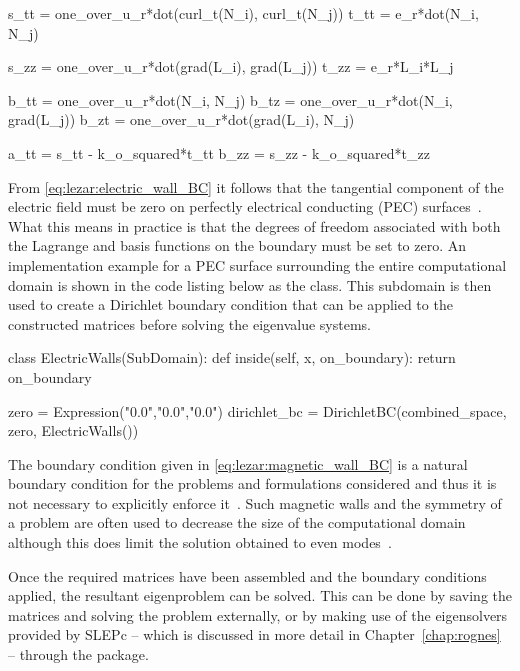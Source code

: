 \begin{python}
s_tt = one_over_u_r*dot(curl_t(N_i), curl_t(N_j))
t_tt = e_r*dot(N_i, N_j)

s_zz = one_over_u_r*dot(grad(L_i), grad(L_j))
t_zz = e_r*L_i*L_j

b_tt = one_over_u_r*dot(N_i, N_j)
b_tz = one_over_u_r*dot(N_i, grad(L_j))
b_zt = one_over_u_r*dot(grad(L_i), N_j)

a_tt = s_tt - k_o_squared*t_tt
b_zz = s_zz - k_o_squared*t_zz
\end{python}

\vspace*{5pt}

\noindent From \eqref{eq:lezar:electric_wall_BC} it follows that the tangential
component of the electric field must be zero on perfectly electrical
conducting (PEC) surfaces~\citep{Smith1997}. What this means in
practice is that the degrees of freedom associated with both the
Lagrange and \nedelec{} basis functions \pagebreak on the boundary must be set
to zero. An implementation example for a PEC surface surrounding the
entire computational domain is shown in the code listing below as the
 class. This subdomain is then used to create a
Dirichlet boundary condition that can be applied to the constructed
matrices before solving the eigenvalue systems.\vspace*{2pt}

\begin{python}
class ElectricWalls(SubDomain):
    def inside(self, x, on_boundary):
        return on_boundary

zero = Expression("0.0","0.0","0.0")
dirichlet_bc = DirichletBC(combined_space, zero, ElectricWalls())
\end{python}

\vspace*{5pt}

The boundary condition given in \eqref{eq:lezar:magnetic_wall_BC}
is a natural boundary condition for the problems and formulations
considered and thus it is not necessary to explicitly enforce
it~\citep{PelosiCoccioliSelleri1998}. Such magnetic walls and the
symmetry of a problem are often used to decrease the size of the
computational domain although this does limit the solution obtained to
even modes~\citep{Jin2002}.

Once the required matrices have been assembled and the boundary conditions
applied, the resultant eigenproblem can be solved. This can be done by
saving the matrices and solving the problem externally, or by making
use of the eigensolvers provided by SLEPc -- which is discussed in more
detail in Chapter~\ref{chap:rognes} -- through the \fenics{} package.

